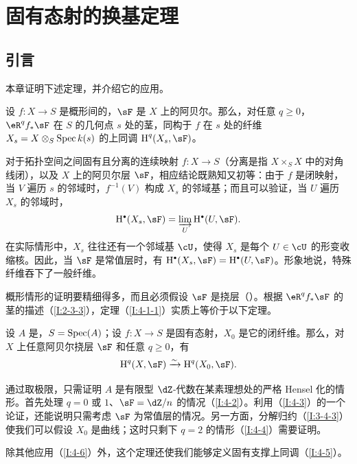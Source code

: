 \section{固有态射的换基定理}\label{I:4}
\subsection{引言}\label{I:4-1}
本章证明下述定理，并介绍它的应用。
\begin{theorem}\label{I:4-1-1}
设 $f:X\to S$ 是概形间的，$\sF$ 是 $X$ 上的阿贝尔。那么，对任意 $q\geqslant0$，$\eR^qf_*\sF$ 在 $S$ 的几何点 $s$ 处的茎，同构于 $f$ 在 $s$ 处的纤维 $X_s=X\otimes_S\operatorname{Spec} k(s)$ 的上同调 $\h^q(X_s,\sF)$。
\end{theorem}
对于拓扑空间之间固有且分离的连续映射 $f:X\to S$（分离是指 $X\times_SX$ 中的对角线闭），以及 $X$ 上的阿贝尔层 $\sF$，相应结论既熟知又初等：由于 $f$ 是闭映射，当 $V$ 遍历 $s$ 的邻域时，$f^{-1}(V)$ 构成 $X_s$ 的邻域基；而且可以验证，当 $U$ 遍历 $X_s$ 的邻域时，
\[
\h^\bullet(X_s,\sF)=\varinjlim_U\h^\bullet(U,\sF).
\]
在实际情形中，$X_s$ 往往还有一个邻域基 $\cU$，使得 $X_s$ 是每个 $U\in\cU$ 的形变收缩核。因此，当 $\sF$ 是常值层时，有 $\h^\bullet(X_s,\sF)=\h^\bullet(U,\sF)$。形象地说，特殊纤维吞下了一般纤维。

概形情形的证明要精细得多，而且必须假设 $\sF$ 是挠层（\cite[XII.2]{sga4}）。根据 $\eR^qf_*\sF$ 的茎的描述（\ref{I:2-3-3}），定理（\ref{I:4-1-1}）实质上等价于以下定理。
\begin{theorem}\label{I:4-1-2}
设 $A$ 是，$S=\operatorname{Spec}(A)$；设 $f:X\to S$ 是固有态射，$X_0$ 是它的闭纤维。那么，对 $X$ 上任意阿贝尔挠层 $\sF$ 和任意 $q\geqslant0$，有
\[
\h^q(X,\sF)\iso\h^q(X_0,\sF).
\]
\end{theorem}
通过取极限，只需证明 $A$ 是有限型 $\dZ$-代数在某素理想处的严格 Hensel 化的情形。首先处理 $q=0$ 或 $1$、$\sF=\dZ/n$ 的情况（\ref{I:4-2}）。利用（\ref{I:4-3}）的一个论证，还能说明只需考虑 $\sF$ 为常值层的情况。另一方面，分解归约（\ref{I:3-4-3}）使我们可以假设 $X_0$ 是曲线；这时只剩下 $q=2$ 的情形（\ref{I:4-4}）需要证明。

除其他应用（\ref{I:4-6}）外，这个定理还使我们能够定义固有支撑上同调（\ref{I:4-5}）。

